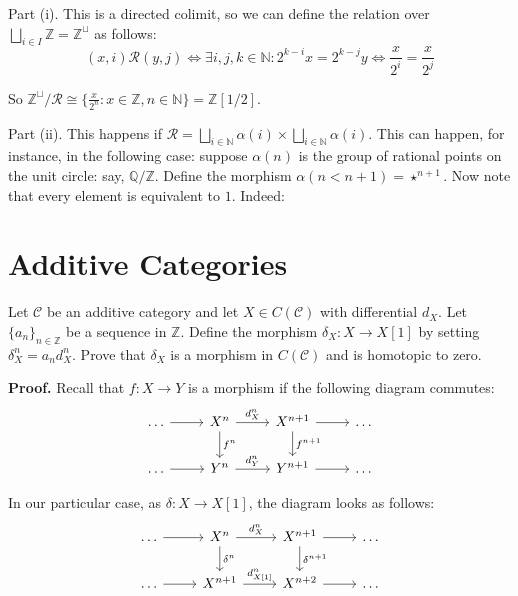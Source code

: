 \documentclass{category-template}
\begin{document}
Part (i). This is a directed colimit, so we can define the relation over $\bigsqcup_{i \in
I}\mathbb{Z} = \mathbb{Z}^{\sqcup}$ as follows:
\begin{equation*}
    (x,i) \mathcal{R} (y,j) \iff \exists i,j,k \in \mathbb{N}: 2^{k-i}x = 2^{k-j}y \iff \frac{x}{2^i} = \frac{x}{2^j}
\end{equation*}

So $\mathbb{Z}^{\sqcup} / \mathcal{R} \cong \{\frac{x}{2^n}: x \in \mathbb{Z}, n
\in \mathbb{N}\} = \boxed{\mathbb{Z}[1/2]}$.

Part (ii). This happens if $\mathcal{R} = \bigsqcup_{i \in \mathbb{N}}\alpha(i)
\times \bigsqcup_{i \in \mathbb{N}}\alpha(i)$. This can happen, for instance, in
the following case: suppose $\alpha(n)$ is the group of rational points on the
unit circle: say, $\mathbb{Q}/\mathbb{Z}$. Define the morphism
$\alpha(n<n+1)=\star^{n+1}$. Now note that every element is equivalent to $1$. 
Indeed:

\section{Additive Categories}

\begin{problem}
    Let $\mathcal{C}$ be an additive category and let $X \in C(\mathcal{C})$
    with differential $d_X$. Let $\{a_n\}_{n \in \mathbb{Z}}$ be a sequence in
    $\mathbb{Z}$. Define the morphism $\delta_X: X \to X[1]$ by setting 
    $\delta_X^n = a_nd_X^n$. Prove that $\delta_X$ is a morphism in 
    $C(\mathcal{C})$ and is homotopic to zero.
\end{problem}

\textbf{Proof.} Recall that $f: X \to Y$ is a morphism if the following diagram commutes:
\[
\begin{tikzcd}
	\dots \arrow{r}{} & {X^n} \arrow{r}{d_X^n} \arrow{d}{f^n} & {X^{n+1}} \arrow{r}{} \arrow{d}{f^{n+1}} & \dots \\
	\dots \arrow{r}{} & {Y^n} \arrow{r}{d_Y^n} & {Y^{n+1}} \arrow{r}{} & \dots
\end{tikzcd}
\]

In our particular case, as $\delta: X \to X[1]$, the diagram looks as follows:
\[
\begin{tikzcd}
	\dots \arrow{r}{} & {X^n} \arrow{r}{d_X^n} \arrow{d}{\delta^n} & {X^{n+1}} \arrow{r}{} \arrow{d}{\delta^{n+1}} & \dots \\
	\dots \arrow{r}{} & {X^{n+1}} \arrow{r}{d_{X[1]}^n} & {X^{n+2}} \arrow{r}{} & \dots
\end{tikzcd}
\]
\end{document}
